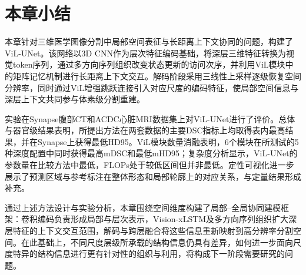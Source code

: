 
\section{本章小结}

本章针对三维医学图像分割中局部空间表征与长距离上下文协同的问题，构建了ViL-UNet。该网络以3D CNN作为层次特征编码基础，将深层三维特征转换为视觉token序列，通过多方向序列组织改变状态更新的访问次序，并利用ViL模块中的矩阵记忆机制进行长距离上下文交互。解码阶段采用三线性上采样逐级恢复空间分辨率，同时通过ViL增强跳跃连接引入对应尺度的编码特征，使局部空间信息与深层上下文共同参与体素级分割重建。

实验在Synapse腹部CT和ACDC心脏MRI数据集上对ViL-UNet进行了评价。总体与器官级结果表明，所提出方法在两套数据的主要DSC指标上均取得表内最高结果，并在Synapse上获得最低HD95。ViL模块数量消融表明，6个模块在所测试的5种深度配置中同时获得最高mDSC和最低mHD95；复杂度分析显示，ViL-UNet的参数量在比较方法中最低，FLOPs处于较低区间但并非最低。定性可视化进一步展示了预测区域与参考标注在整体形态和局部轮廓上的对应关系，与定量结果形成补充。

通过上述方法设计与实验分析，本章围绕空间维度构建了局部--全局协同建模框架：卷积编码负责形成局部与层次表示，Vision-xLSTM及多方向序列组织扩大深层特征的上下文交互范围，解码与跨层融合将这些信息重新映射到高分辨率分割空间。在此基础上，不同尺度层级所承载的结构信息仍具有差异，如何进一步面向尺度特异的结构信息进行更有针对性的组织与利用，将构成下一阶段需要研究的问题。

